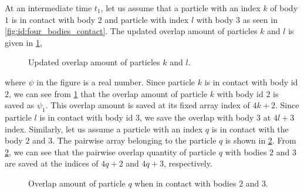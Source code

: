 At an intermediate time $t_1$, let us assume that a particle with an index $k$ of body
$1$ is in contact with body $2$ and particle with index $l$ with body $3$ as seen in
\cref{fig:id:four_bodies_contact}. The updated overlap amount of particles $k$
and $l$ is given in \cref{fig:id:k_f_overlap_t_1},
\begin{figure}[!htpb]
  \centering
  \footnotesize
  \caption{Updated overlap amount of particles $k$ and $l$.}
\label{fig:id:k_f_overlap_t_1}
\end{figure}
where $\psi$ in the figure is a real number. Since particle $k$ is in contact
with body id $2$, we can see from \cref{fig:id:k_f_overlap_t_1} that the overlap
amount of particle $k$ with body id $2$ is saved as $\psi_1$. This overlap
amount is saved at its fixed array index of $4k+2$. Since particle $l$ is in
contact with body id $3$, we save the overlap with body $3$ at $4l+3$ index.
Similarly, let us assume a particle with an index $q$ is in contact with the
body $2$ and $3$. The pairwise array belonging to the particle $q$ is shown in
\cref{fig:id:overlap_of_q_at_t_1}. From \cref{fig:id:overlap_of_q_at_t_1}, we
can see that the pairwise overlap quantity of particle $q$ with bodies $2$ and
$3$ are saved at the indices of $4q+2$ and $4q+3$, respectively.
\begin{figure}[!htpb]
  \centering
  \footnotesize
  \caption{Overlap amount of particle $q$ when in contact with bodies $2$ and $3$.}
  \label{fig:id:overlap_of_q_at_t_1}
\end{figure}

